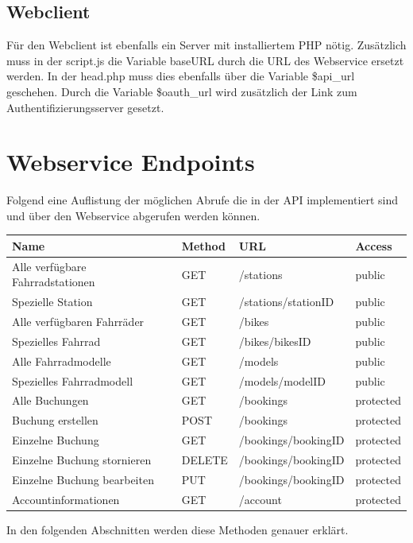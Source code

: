 \section{Webclient}
Für den Webclient ist ebenfalls ein Server mit installiertem PHP nötig. Zusätzlich muss in der script.js die Variable baseURL durch die URL des Webservice ersetzt werden. In der head.php muss dies ebenfalls über die Variable \$api\_url geschehen. Durch die Variable \$oauth\_url wird zusätzlich der Link zum Authentifizierungsserver gesetzt.

\chapter{Webservice Endpoints}

Folgend eine Auflistung der möglichen Abrufe die in der API implementiert sind und über den Webservice abgerufen werden können.

\begin{tabularx}{\columnwidth}{|X|p{1.5cm}|X|p{1.5cm}|}
	\hline
	Name & Method & URL & Access \\
	\hline
	\hline
	Alle verfügbare Fahrradstationen & GET & /stations & public \\
	\hline
	Spezielle Station & GET & /stations/stationID & public \\
	\hline
	Alle verfügbaren Fahrräder & GET & /bikes & public \\
	\hline
	Spezielles Fahrrad & GET & /bikes/bikesID & public \\
	\hline
	Alle Fahrradmodelle & GET & /models & public \\
	\hline
	Spezielles Fahrradmodell & GET & /models/modelID & public \\
	\hline
	Alle Buchungen & GET & /bookings & protected \\
	\hline
	Buchung erstellen & POST & /bookings & protected \\
	\hline
	Einzelne Buchung & GET & /bookings/bookingID & protected \\
	\hline
	Einzelne Buchung stornieren & DELETE & /bookings/bookingID & protected \\
	\hline
	Einzelne Buchung bearbeiten & PUT & /bookings/bookingID & protected \\
	\hline
	Accountinformationen & GET & /account & protected \\
	\hline
\end{tabularx}

In den folgenden Abschnitten werden diese Methoden genauer erklärt.

